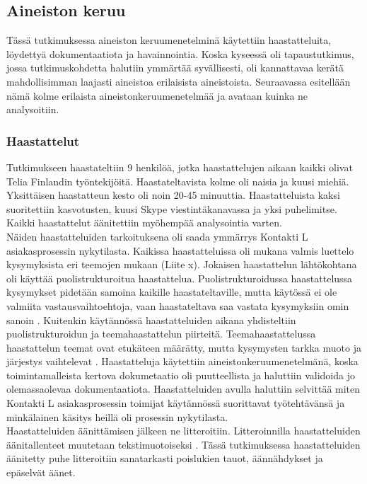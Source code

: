 \documentclass[finnish,12pt,a4paper,pdftex]{article}
\begin{document}

\subsection{Aineiston keruu}
Tässä tutkimuksessa aineiston keruumenetelminä käytettiin haastatteluita, löydettyä dokumentaatiota ja havainnointia. Koska kyseessä oli tapaustutkimus, jossa tutkimuskohdetta halutiin ymmärtää syvällisesti, oli kannattavaa kerätä mahdollisimman laajasti aineistoa erilaisista aineistoista. Seuraavassa esitellään nämä kolme erilaista aineistonkeruumenetelmää ja avataan kuinka ne analysoitiin.

\subsubsection{Haastattelut}
Tutkimukseen haastateltiin 9 henkilöä, jotka haastattelujen aikaan kaikki olivat Telia Finlandin työntekijöitä. Haastateltavista kolme oli naisia ja kuusi miehiä. Yksittäisen haastatteun kesto oli noin 20-45 minuuttia. Haastatteluista kaksi suoritettiin kasvotusten, kuusi Skype viestintäkanavassa ja yksi puhelimitse. Kaikki haastattelut äänitettiin myöhempää analysointia varten. \\

Näiden haastatteluiden tarkoituksena oli saada ymmärrys Kontakti L asiakasprosessin nykytilasta. Kaikissa haastatteluissa oli mukana valmis luettelo kysymyksista eri teemojen mukaan (Liite x). Jokaisen haastattelun lähtökohtana oli käyttää puolistrukturoitua haastattelua. Puolistrukturoidussa haastattelussa kysymykset pidetään samoina kaikille haastateltaville, mutta käytössä ei ole valmiita vastausvaihtoehtoja, vaan haastateltava saa vastata kysymyksiin omin sanoin \citep{eskola}. Kuitenkin käytännössä haastatteluiden aikana yhdisteltiin puolistrukturoidun ja teemahaastattelun piirteitä. Teemahaastattelussa haastattelun teemat ovat etukäteen määrätty, mutta kysymysten tarkka muoto ja järjestys vaihtelevat \citep{eskola}. Haastatteluja käytettiin aineistonkeruumenetelmänä, koska toimintamalleista kertova dokumetaatio oli puutteellista ja haluttiin validoida jo olemassaolevaa dokumentaatiota. Haastatteluiden avulla haluttiin selvittää miten Kontakti L asiakasprosessin toimijat käytännössä suorittavat työtehtävänsä ja minkälainen käsitys heillä oli prosessin nykytilasta.\\

Haastatteluiden äänittämisen jälkeen ne litteroitiin. Litteroinnilla haastatteluiden äänitallenteet muutetaan tekstimuotoiseksi \citep{eskola}. Tässä tutkimuksessa haastatteluiden äänitetty puhe litteroitiin sanatarkasti poislukien tauot, äännähdykset ja epäselvät äänet.
\end{document}
